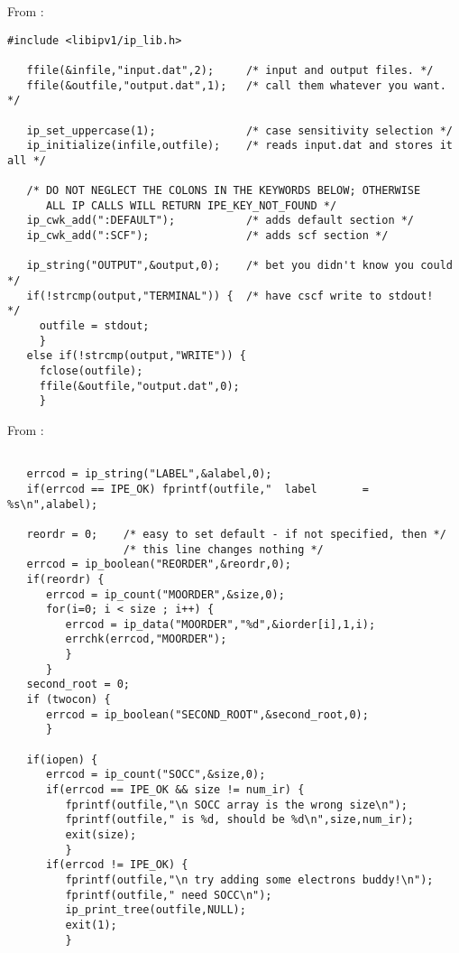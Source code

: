 From :
\begin{verbatim}
#include <libipv1/ip_lib.h>

   ffile(&infile,"input.dat",2);     /* input and output files. */
   ffile(&outfile,"output.dat",1);   /* call them whatever you want. */

   ip_set_uppercase(1);              /* case sensitivity selection */
   ip_initialize(infile,outfile);    /* reads input.dat and stores it all */

   /* DO NOT NEGLECT THE COLONS IN THE KEYWORDS BELOW; OTHERWISE
      ALL IP CALLS WILL RETURN IPE_KEY_NOT_FOUND */
   ip_cwk_add(":DEFAULT");           /* adds default section */
   ip_cwk_add(":SCF");               /* adds scf section */

   ip_string("OUTPUT",&output,0);    /* bet you didn't know you could */
   if(!strcmp(output,"TERMINAL")) {  /* have cscf write to stdout!    */
     outfile = stdout;
     }
   else if(!strcmp(output,"WRITE")) {
     fclose(outfile);
     ffile(&outfile,"output.dat",0);
     }
\end{verbatim}

From :
\begin{verbatim}

   errcod = ip_string("LABEL",&alabel,0);
   if(errcod == IPE_OK) fprintf(outfile,"  label       = %s\n",alabel);

   reordr = 0;    /* easy to set default - if not specified, then */
                  /* this line changes nothing */
   errcod = ip_boolean("REORDER",&reordr,0); 
   if(reordr) {
      errcod = ip_count("MOORDER",&size,0);
      for(i=0; i < size ; i++) {
         errcod = ip_data("MOORDER","%d",&iorder[i],1,i);
         errchk(errcod,"MOORDER");
         }
      }
   second_root = 0;
   if (twocon) {
      errcod = ip_boolean("SECOND_ROOT",&second_root,0);
      }

   if(iopen) {
      errcod = ip_count("SOCC",&size,0);
      if(errcod == IPE_OK && size != num_ir) {
         fprintf(outfile,"\n SOCC array is the wrong size\n");
         fprintf(outfile," is %d, should be %d\n",size,num_ir);
         exit(size);
         }
      if(errcod != IPE_OK) {
         fprintf(outfile,"\n try adding some electrons buddy!\n");
         fprintf(outfile," need SOCC\n");
         ip_print_tree(outfile,NULL);
         exit(1);
         }
\end{verbatim}

